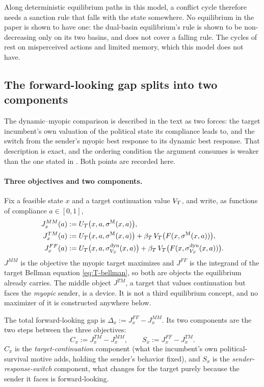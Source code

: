 Along deterministic equilibrium paths in this model, a conflict cycle therefore
needs a sanction rule that falls with the state somewhere. No equilibrium in the
paper is shown to have one: the dual-basin equilibrium's rule is shown to be
non-decreasing only on its two basins, and  does not
cover a falling rule. The cycles of \citet{AcemogluWolitzky2014} rest on
misperceived actions and limited memory, which this model does not have.

\subsection{The forward-looking gap splits into two components}
\label{app:two-channel}

The dynamic--myopic comparison is described in the text as two forces: the target
incumbent's own valuation of the political state its compliance leads to, and the
switch from the sender's myopic best response to its dynamic best response. That
description is exact, and the ordering condition the argument consumes is weaker
than the one stated in . Both points are recorded here.

\paragraph{Three objectives and two components.}
Fix a feasible state $x$ and a target continuation value $V_T$, and write, as
functions of compliance $a\in[0,1]$,
\begin{align}
J^{MM}_x(a)&:=U_T\bigl(x,a,\sigma^{\mathrm{M}}(x,a)\bigr),
\label{eq:JMM}\\
J^{TM}_x(a)&:=U_T\bigl(x,a,\sigma^{\mathrm{M}}(x,a)\bigr)
   +\beta_T\,V_T\bigl(F(x,\sigma^{\mathrm{M}}(x,a))\bigr),
\label{eq:JTM}\\
J^{FF}_x(a)&:=U_T\bigl(x,a,\sigma^{\mathrm{dyn}}_{V_S}(x,a)\bigr)
   +\beta_T\,V_T\bigl(F(x,\sigma^{\mathrm{dyn}}_{V_S}(x,a))\bigr).
\label{eq:JFF}
\end{align}
$J^{MM}$ is the objective the myopic target maximizes and $J^{FF}$ is the
integrand of the target Bellman equation \eqref{eq:T-bellman}, so both are
objects the equilibrium already carries. The middle object $J^{TM}$, a target
that values continuation but faces the \emph{myopic} sender, is a device. It
is not a third equilibrium concept, and no maximizer of it is constructed
anywhere below.

The total forward-looking gap is $\Delta_x:=J^{FF}_x-J^{MM}_x$. Its two
components are the two steps between the three objectives:
\begin{equation}
C_x:=J^{TM}_x-J^{MM}_x,
\qquad
S_x:=J^{FF}_x-J^{TM}_x.
\label{eq:two-channels}
\end{equation}
$C_x$ is the \emph{target-continuation} component (what the incumbent's own
political-survival motive adds, holding the sender's behavior fixed), and
$S_x$ is the \emph{sender-response-switch} component, what changes for the target
purely because the sender it faces is forward-looking.

